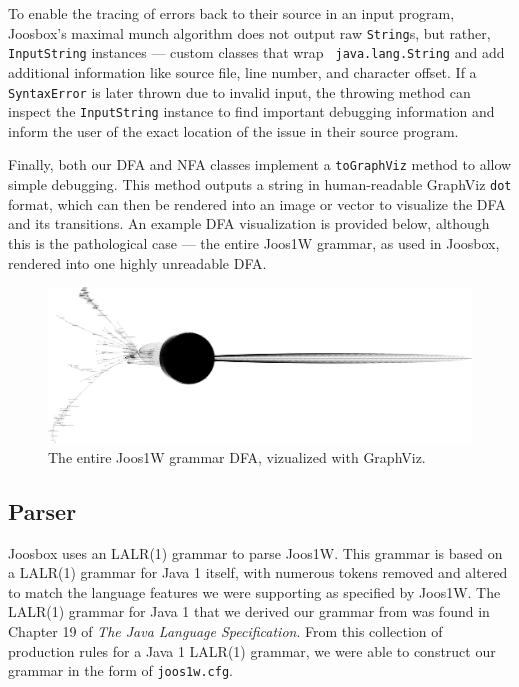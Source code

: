 \documentclass[letterpaper]{article}
\begin{document}
  To enable the tracing of errors back to their source in an input program,
  Joosbox's maximal munch algorithm does not output raw {\tt String}s, but
  rather, {\tt InputString} instances --- custom classes that wrap {\tt
  java.lang.String} and add additional information like source file, line
  number, and character offset. If a {\tt SyntaxError} is later thrown due to
  invalid input, the throwing method can inspect the {\tt InputString}
  instance to find important debugging information and inform the user of the
  exact location of the issue in their source program.

  Finally, both our DFA and NFA classes implement a {\tt toGraphViz} method to
  allow simple debugging. This method outputs a string in human-readable GraphViz {\tt dot}
  format, which can then be rendered into an image or vector to visualize the
  DFA and its transitions. An example DFA visualization is provided below, although
  this is the pathological case --- the entire Joos1W grammar, as used in Joosbox, rendered
  into one highly unreadable DFA.

  \begin{figure}[h!]
    \caption{The entire Joos1W grammar DFA, vizualized with GraphViz.}
    \centering
      \includegraphics[width=1\textwidth]{thejoosdfa.png}
  \end{figure}

  \subsection{Parser}

  Joosbox uses an LALR(1) grammar to parse Joos1W. This grammar is based on a
  LALR(1) grammar for Java 1 itself, with numerous tokens removed and altered to
  match the language features we were supporting as specified by Joos1W. The
  LALR(1) grammar for Java 1 that we derived our grammar from was found in
  Chapter 19 of {\em The Java Language Specification}. From this collection of
  production rules for a Java 1 LALR(1) grammar, we were able to construct our
  grammar in the form of {\tt joos1w.cfg}.
\end{document}
